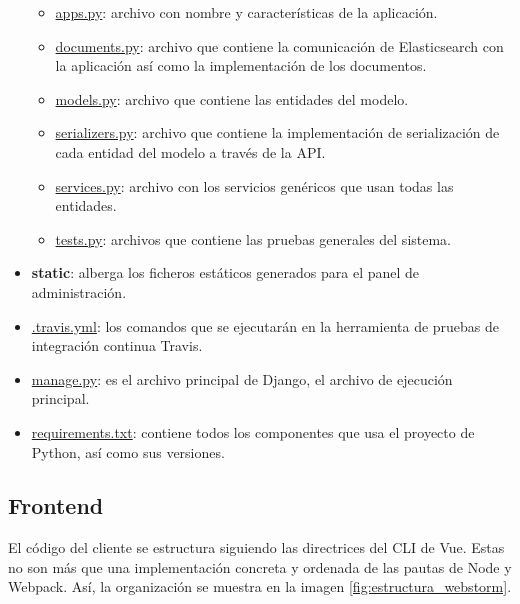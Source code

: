 \begin{itemize}
\begin{itemize}
        \item \underline{apps.py}: archivo con nombre y características de la aplicación.
        \item \underline{documents.py}: archivo que contiene la comunicación de Elasticsearch con la aplicación así como la implementación de los documentos.
        \item \underline{models.py}: archivo que contiene las entidades del modelo.
        \item \underline{serializers.py}: archivo que contiene la implementación de serialización de cada entidad del modelo a través de la API.
        \item \underline{services.py}: archivo con los servicios genéricos que usan todas las entidades.
        \item \underline{tests.py}: archivos que contiene las pruebas generales del sistema.
    \end{itemize}
    \item \textbf{static}: alberga los ficheros estáticos generados para el panel de administración.
    \item \underline{.travis.yml}: los comandos que se ejecutarán en la herramienta de pruebas de integración continua Travis.
    \item \underline{manage.py}: es el archivo principal de Django, el archivo de ejecución principal.
    \item \underline{requirements.txt}: contiene todos los componentes que usa el proyecto de Python, así como sus versiones.
\end{itemize}

\subsection{Frontend}

El código del cliente se estructura siguiendo las directrices del CLI de Vue. Estas no son más que una implementación concreta y ordenada de las pautas de Node y Webpack. Así, la organización se muestra en la imagen \ref{fig:estructura_webstorm}.


